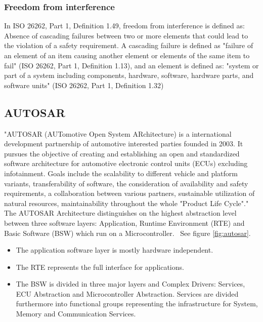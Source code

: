 \subsubsection{Freedom from interference}
In ISO 26262, Part 1, Definition 1.49, freedom from interference is defined as: Absence of cascading failures between two or more elements that could lead to the violation of a safety requirement. A cascading failure is defined as "failure of an element of an item causing another element or elements of the same item to fail" (ISO 26262, Part 1, Definition 1.13), and an element is defined as: "system or part of a system including components, hardware, software, hardware parts, and software units" (ISO 26262, Part 1, Definition 1.32)

\subsection{AUTOSAR}
"AUTOSAR (AUTomotive Open System ARchitecture) is a international development partnership of automotive interested parties founded in 2003. It pursues the objective of creating and establishing an open and standardized software architecture for automotive electronic control units (ECUs) excluding infotainment. Goals include the scalability to different vehicle and platform variants, transferability of software, the consideration of availability and safety requirements, a collaboration between various partners, sustainable utilization of natural resources, maintainability throughout the whole "Product Life Cycle"."~\cite{website:autosar}\\

The AUTOSAR Architecture distinguishes on the highest abstraction level between three software layers: Application, Runtime Environment (RTE) and Basic Software (BSW) which run on a Microcontroller.~\cite{website:autosar} See figure \ref{fig:autosar}.
\begin{itemize}
\item The application software layer is mostly hardware independent.
\item The RTE represents the full interface for applications.
\item The BSW is divided in three major layers and Complex Drivers: Services, ECU Abstraction and Microcontroller Abstraction. Services are divided furthermore into functional groups representing the infrastructure for System, Memory and Communication Services.
\end{itemize}

